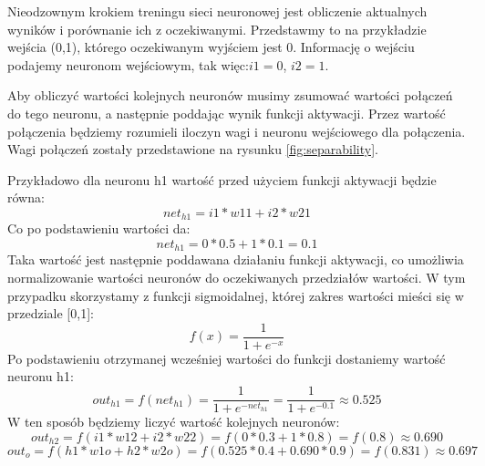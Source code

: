 Nieodzownym krokiem treningu sieci neuronowej jest obliczenie aktualnych wyników i porównanie ich z oczekiwanymi.
Przedstawmy to na przykładzie wejścia (0,1), którego oczekiwanym wyjściem jest 0.
Informację o wejściu podajemy neuronom wejściowym, tak więc:\(i1=0\), \(i2=1\).

Aby obliczyć wartości kolejnych neuronów musimy zsumować wartości połączeń do tego neuronu, a następnie poddając wynik funkcji aktywacji.
Przez wartość połączenia będziemy rozumieli iloczyn wagi i neuronu wejściowego dla połączenia.
Wagi połączeń zostały przedstawione na rysunku \ref{fig:separability}.

Przykładowo dla neuronu h1 wartość przed użyciem funkcji aktywacji będzie równa:
\[
  net_{h1}  = i1*w11+i2*w21
\]
Co po podstawieniu wartości da:
\[
  net_{h1} = 0*0.5+1*0.1=0.1
\]
Taka wartość jest następnie poddawana działaniu funkcji aktywacji, 
co umożliwia normalizowanie wartości neuronów do oczekiwanych przedziałów wartości.
W tym przypadku skorzystamy z funkcji sigmoidalnej, której zakres wartości mieści się w przedziale [0,1]:
\[
    f(x) =  \frac{1}{1 + e^{-x} } 
\]
Po podstawieniu otrzymanej wcześniej wartości do funkcji dostaniemy wartość neuronu h1:
\[
    out_{h1} 
    = f(net_{h1}) 
    =  \frac{1 }{1 + e^{-net_{h1}} } 
    =  \frac{1 }{1 + e^{-0.1} } \approx 0.525
\]
W ten sposób będziemy liczyć wartość kolejnych neuronów:
\[
    out_{h2}=f(i1*w12+i2*w22)=f(0*0.3+1*0.8)=f(0.8) \approx 0.690
\]
\[
    out_{o}=f(h1*w1o+h2*w2o)=f(0.525*0.4+0.690*0.9)=f(0.831) \approx 0.697
\]
